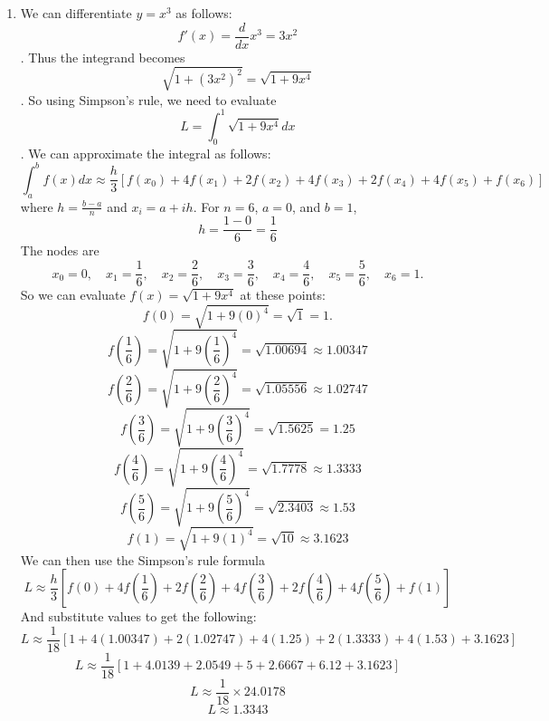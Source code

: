 \documentclass[12pt]{article}
\begin{document}
\begin{enumerate}[leftmargin=2em]
    \item We can differentiate $y=x^{3}$ as follows:
    \[ f'(x) = \frac{d}{dx}x^{3} = 3x^{2}\].
    Thus the integrand becomes 
    \[\sqrt{1+(3x^{2})^{2}} = \sqrt{1+9x^{4}}\].
    So using Simpson's rule, we need to evaluate 
    \[L = \int_{0}^{1}\sqrt{1+9x^{4}}dx\].
    We can approximate the integral as follows:
    \[\int_{a}^{b}f(x)dx \approx \frac{h}{3}[f(x_0)+4f(x_1)+2f(x_2)+4f(x_3)+2f(x_4)+4f(x_5)+f(x_6)]\]
    where $h = \frac{b-a}{n}$ and $x_i = a+ih$.
    For $n=6$, $a=0$, and $b=1$,
    \[h=\frac{1-0}{6} = \frac{1}{6}\]
    The nodes are
    \[x_0 = 0, \quad x_1 = \frac{1}{6}, \quad x_2 = \frac{2}{6}, \quad x_3 = \frac{3}{6}, \quad x_4 = \frac{4}{6}, \quad x_5 = \frac{5}{6}, \quad x_6 = 1.\]
    So we can evaluate $f(x) = \sqrt{1+9x^4}$ at these points:
    \[f(0) = \sqrt{1 + 9(0)^4} = \sqrt{1} = 1.\]
    \[f\left(\frac{1}{6}\right) = \sqrt{1 + 9\left(\frac{1}{6}\right)^4} = \sqrt{1.00694} \approx 1.00347\]
    \[f\left(\frac{2}{6}\right) = \sqrt{1 + 9\left(\frac{2}{6}\right)^4} = \sqrt{1.05556} \approx 1.02747\]
    \[f\left(\frac{3}{6}\right) = \sqrt{1 + 9\left(\frac{3}{6}\right)^4} = \sqrt{1.5625} = 1.25\]
    \[f\left(\frac{4}{6}\right) = \sqrt{1 + 9\left(\frac{4}{6}\right)^4} = \sqrt{1.7778} \approx 1.3333\]
    \[f\left(\frac{5}{6}\right) = \sqrt{1 + 9\left(\frac{5}{6}\right)^4} = \sqrt{2.3403} \approx 1.53\]
    \[f(1) = \sqrt{1 + 9(1)^4} = \sqrt{10} \approx 3.1623\]
    We can then use the Simpson's rule formula
    \[L \approx \frac{h}{3} \left[ f(0) + 4f\left(\frac{1}{6}\right) + 2f\left(\frac{2}{6}\right) + 4f\left(\frac{3}{6}\right) + 2f\left(\frac{4}{6}\right) + 4f\left(\frac{5}{6}\right) + f(1) \right]\]
    And substitute values to get the following:
    \[L \approx \frac{1}{18} \left[ 1 + 4(1.00347) + 2(1.02747) + 4(1.25) + 2(1.3333) + 4(1.53) + 3.1623 \right]\]
    \[L \approx \frac{1}{18} \left[ 1 + 4.0139 + 2.0549 + 5 + 2.6667 + 6.12 + 3.1623 \right]\]
    \[L \approx \frac{1}{18} \times 24.0178\]
    \[L \approx 1.3343\]



\end{enumerate}
\end{document}
